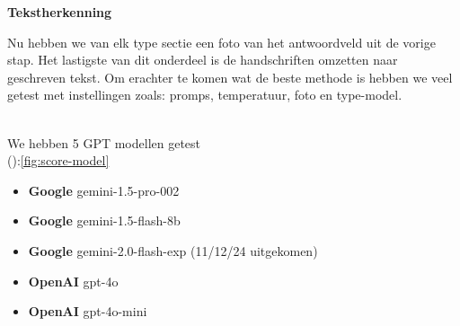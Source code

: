 \documentclass[12pt]{article}
\begin{document}
\noindent
\textbf{Tekstherkenning}
\begin{multicols}{2}
Nu hebben we van elk type sectie een foto van het antwoordveld uit de vorige stap. Het lastigste van dit onderdeel is de handschriften omzetten naar geschreven tekst. Om erachter te komen wat de beste methode is hebben we veel getest met instellingen zoals: promps, temperatuur, foto en type-model.\\
\\
\begin{minipage}{\textwidth}
We hebben 5 GPT modellen getest\\ (\cite{geminiproManual, openaiManual}):\ref{fig:score-model}
\begin{itemize}
    \item \textbf{Google} gemini-1.5-pro-002
    \item \textbf{Google} gemini-1.5-flash-8b
    \item \textbf{Google} gemini-2.0-flash-exp \newline (11/12/24 uitgekomen)
    \item \textbf{OpenAI} gpt-4o
    \item \textbf{OpenAI} gpt-4o-mini
\end{itemize}
\end{minipage}


\end{multicols}
\end{document}
